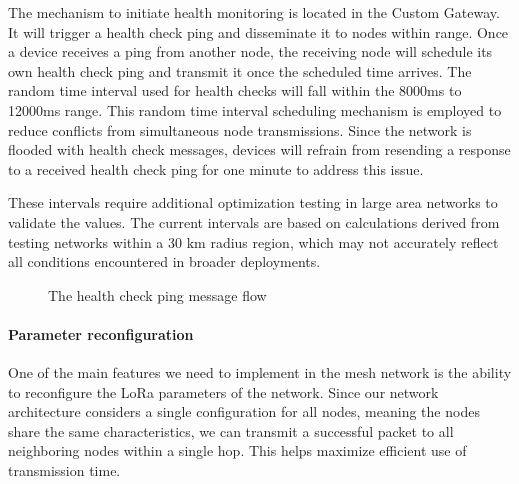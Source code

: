 

The mechanism to initiate health monitoring is located in the Custom Gateway. It will trigger a health check ping and disseminate it to nodes within range. Once a device receives a ping from another node, the receiving node will schedule its own health check ping and transmit it once the scheduled time arrives. The random time interval used for health checks will fall within the 8000ms to 12000ms range. This random time interval scheduling mechanism is employed to reduce conflicts from simultaneous node transmissions. Since the network is flooded with health check messages, devices will refrain from resending a response to a received health check ping for one minute to address this issue.

These intervals require additional optimization testing in large area networks to validate the values. The current intervals are based on calculations derived from testing networks within a 30 km radius region, which may not accurately reflect all conditions encountered in broader deployments.


\begin{figure}[ht!]
    \centering
    
    \caption{The health check ping message flow}
    \label{fig:healthck}
\end{figure}
\newpage

\paragraph{Parameter reconfiguration}\label{par:reconf}

One of the main features we need to implement in the mesh network is the ability to reconfigure the LoRa parameters of the network. Since our network architecture considers a single configuration for all nodes, meaning the nodes share the same characteristics, we can transmit a successful packet to all neighboring nodes within a single hop. This helps maximize efficient use of transmission time.

